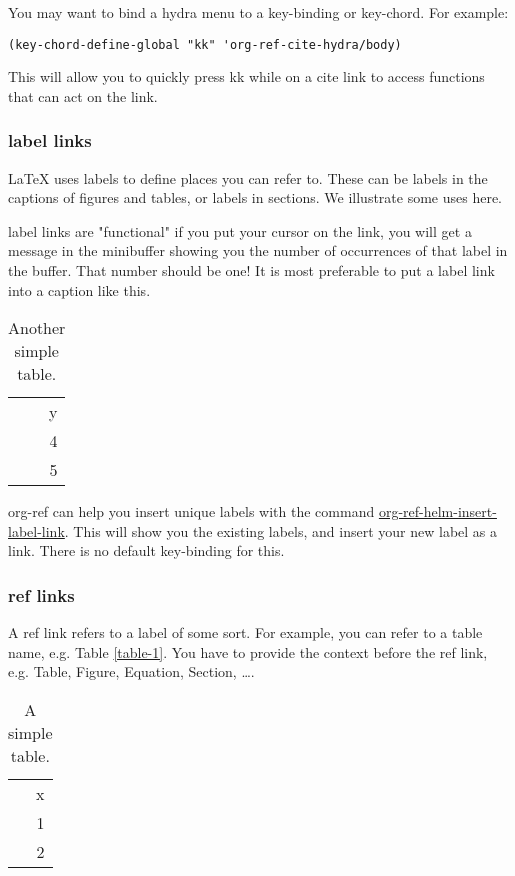 \documentclass[11pt]{article}
\begin{document}
You may want to bind a hydra menu to a key-binding or key-chord. For example:

\begin{verbatim}
(key-chord-define-global "kk" 'org-ref-cite-hydra/body)
\end{verbatim}

This will allow you to quickly press kk while on a cite link to access functions that can act on the link.

\subsubsection{label links}
\label{sec:orgheadline4}

\LaTeX{} uses labels to define places you can refer to. These can be labels in the captions of figures and tables, or labels in sections. We illustrate some uses here.

label links are "functional" if you put your cursor on the link, you will get a message in the minibuffer showing you the number of occurrences of that label in the buffer. That number should be one! It is most preferable to put a label link into a caption like this.
\begin{table}[htb]
\caption{Another simple table. \label{tab-ydata}}
\centering
\begin{tabular}{r}
y\\
4\\
5\\
\end{tabular}
\end{table}

org-ref can help you insert unique labels with the command \url{org-ref-helm-insert-label-link}. This will show you the existing labels, and insert your new label as a link. There is no default key-binding for this.

\subsubsection{ref links}
\label{sec:orgheadline6}

A ref link refers to a label of some sort. For example, you can refer to a table name, e.g. Table \ref{table-1}. You have to provide the context before the ref link, e.g. Table, Figure, Equation, Section, \ldots{}.

\begin{table}[htb]
\caption{\label{tab:orgtable1}
A simple table.}
\centering
\begin{tabular}{r}
x\\
1\\
2\\
\end{tabular}
\end{table}
\end{document}
